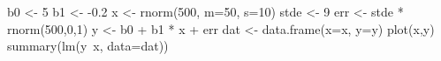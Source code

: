 \begin{Schunk}
\begin{Sinput}
 b0 <- 5
 b1 <- -0.2
 x <- rnorm(500, m=50, s=10)
 stde <- 9
 err <- stde * rnorm(500,0,1)
 y <- b0 + b1 * x + err
 dat <- data.frame(x=x, y=y)
 plot(x,y)
 summary(lm(y~x, data=dat))
\end{Sinput}
\end{Schunk}

